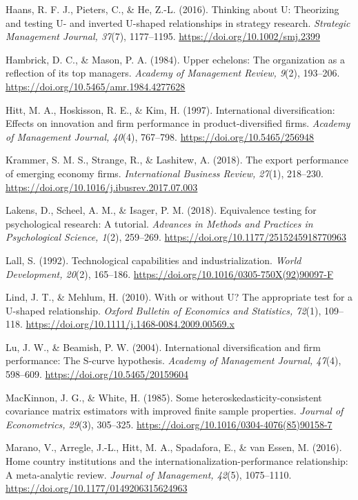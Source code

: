 \documentclass[12pt,a4paper]{article}
\begin{document}
Haans, R. F. J., Pieters, C., \& He, Z.-L. (2016). Thinking about U:
Theorizing and testing U- and inverted U-shaped relationships in
strategy research. \emph{Strategic Management Journal, 37}(7),
1177--1195. \url{https://doi.org/10.1002/smj.2399}

Hambrick, D. C., \& Mason, P. A. (1984). Upper echelons: The
organization as a reflection of its top managers. \emph{Academy of
Management Review, 9}(2), 193--206.
\url{https://doi.org/10.5465/amr.1984.4277628}

Hitt, M. A., Hoskisson, R. E., \& Kim, H. (1997). International
diversification: Effects on innovation and firm performance in
product-diversified firms. \emph{Academy of Management Journal, 40}(4),
767--798. \url{https://doi.org/10.5465/256948}

Krammer, S. M. S., Strange, R., \& Lashitew, A. (2018). The export
performance of emerging economy firms. \emph{International Business
Review, 27}(1), 218--230.
\url{https://doi.org/10.1016/j.ibusrev.2017.07.003}

Lakens, D., Scheel, A. M., \& Isager, P. M. (2018). Equivalence testing
for psychological research: A tutorial. \emph{Advances in Methods and
Practices in Psychological Science, 1}(2), 259--269.
\url{https://doi.org/10.1177/2515245918770963}

Lall, S. (1992). Technological capabilities and industrialization.
\emph{World Development, 20}(2), 165--186.
\url{https://doi.org/10.1016/0305-750X(92)90097-F}

Lind, J. T., \& Mehlum, H. (2010). With or without U? The appropriate
test for a U-shaped relationship. \emph{Oxford Bulletin of Economics and
Statistics, 72}(1), 109--118.
\url{https://doi.org/10.1111/j.1468-0084.2009.00569.x}

Lu, J. W., \& Beamish, P. W. (2004). International diversification and
firm performance: The S-curve hypothesis. \emph{Academy of Management
Journal, 47}(4), 598--609. \url{https://doi.org/10.5465/20159604}

MacKinnon, J. G., \& White, H. (1985). Some
heteroskedasticity-consistent covariance matrix estimators with improved
finite sample properties. \emph{Journal of Econometrics, 29}(3),
305--325. \url{https://doi.org/10.1016/0304-4076(85)90158-7}

Marano, V., Arregle, J.-L., Hitt, M. A., Spadafora, E., \& van Essen, M.
(2016). Home country institutions and the
internationalization-performance relationship: A meta-analytic review.
\emph{Journal of Management, 42}(5), 1075--1110.
\url{https://doi.org/10.1177/0149206315624963}
\end{document}
